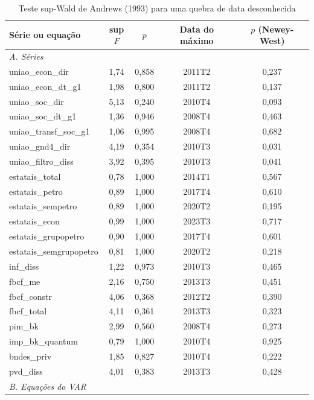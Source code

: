 \begin{table}[htbp]
\centering
\caption{Teste sup-Wald de Andrews (1993) para uma quebra de data desconhecida}
\label{tab:a4_supf}
\scriptsize
\begin{tabular}{lcccc}
\toprule
S\'erie ou equa\c{c}\~ao & sup$F$ & $p$ & Data do m\'aximo & $p$ (Newey-West) \\
\midrule
\multicolumn{5}{l}{\textit{A. S\'eries}} \\
uniao\_econ\_dir & 1{,}74 & 0{,}858 & 2011T2 & 0{,}237 \\
uniao\_econ\_dt\_g1 & 1{,}98 & 0{,}800 & 2011T2 & 0{,}137 \\
uniao\_soc\_dir & 5{,}13 & 0{,}240 & 2010T4 & 0{,}093 \\
uniao\_soc\_dt\_g1 & 1{,}36 & 0{,}946 & 2008T4 & 0{,}463 \\
uniao\_transf\_soc\_g1 & 1{,}06 & 0{,}995 & 2008T4 & 0{,}682 \\
uniao\_gnd4\_dir & 4{,}19 & 0{,}354 & 2010T3 & 0{,}031 \\
uniao\_filtro\_diss & 3{,}92 & 0{,}395 & 2010T3 & 0{,}041 \\
estatais\_total & 0{,}78 & 1{,}000 & 2014T1 & 0{,}567 \\
estatais\_petro & 0{,}89 & 1{,}000 & 2017T4 & 0{,}610 \\
estatais\_sempetro & 0{,}89 & 1{,}000 & 2020T2 & 0{,}195 \\
estatais\_econ & 0{,}99 & 1{,}000 & 2023T3 & 0{,}717 \\
estatais\_grupopetro & 0{,}90 & 1{,}000 & 2017T4 & 0{,}601 \\
estatais\_semgrupopetro & 0{,}81 & 1{,}000 & 2020T2 & 0{,}218 \\
inf\_diss & 1{,}22 & 0{,}973 & 2010T3 & 0{,}465 \\
fbcf\_me & 2{,}16 & 0{,}750 & 2013T3 & 0{,}451 \\
fbcf\_constr & 4{,}06 & 0{,}368 & 2012T2 & 0{,}390 \\
fbcf\_total & 4{,}11 & 0{,}361 & 2013T3 & 0{,}323 \\
pim\_bk & 2{,}99 & 0{,}560 & 2008T4 & 0{,}273 \\
imp\_bk\_quantum & 0{,}79 & 1{,}000 & 2010T4 & 0{,}925 \\
bndes\_priv & 1{,}85 & 0{,}827 & 2010T4 & 0{,}222 \\
pvd\_diss & 4{,}01 & 0{,}383 & 2013T3 & 0{,}428 \\
\midrule
\multicolumn{5}{l}{\textit{B. Equa\c{c}\~oes do VAR}} \\

\end{tabular}
\end{table}
